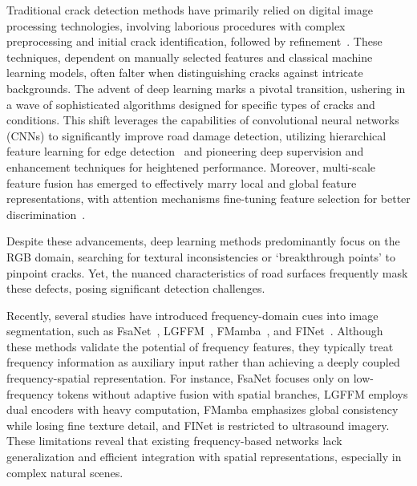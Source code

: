 \documentclass[journal]{IEEEtran}
\begin{document}
Traditional crack detection methods have primarily relied on digital image processing technologies, involving laborious procedures with complex preprocessing and initial crack identification, followed by refinement~\cite{DBLP:conf/icarcv/DinhHL16,DBLP:journals/tits/OliveiraC13}. These techniques, dependent on manually selected features and classical machine learning models, often falter when distinguishing cracks against intricate backgrounds. The advent of deep learning marks a pivotal transition, ushering in a wave of sophisticated algorithms designed for specific types of cracks and conditions. This shift leverages the capabilities of convolutional neural networks (CNNs) to significantly improve road damage detection, utilizing hierarchical feature learning for edge detection~\cite{DBLP:journals/ijon/LiuYLXL19,DBLP:journals/tits/YangZYPML20} and pioneering deep supervision and enhancement techniques for heightened performance. Moreover, multi-scale feature fusion has emerged to effectively marry local and global feature representations, with attention mechanisms fine-tuning feature selection for better discrimination~\cite{DBLP:journals/wicomm/HuHYHL21,DBLP:journals/cacie/QuqaLL23,li2018automatic}.

Despite these advancements, deep learning methods predominantly focus on the RGB domain, searching for textural inconsistencies or `breakthrough points' to pinpoint cracks. Yet, the nuanced characteristics of road surfaces frequently mask these defects, posing significant detection challenges. 





Recently, several studies have introduced frequency-domain cues into image segmentation, such as FsaNet~\cite{DBLP:journals/tip/ZhangPG23}, LGFFM~\cite{11129883TMI}, FMamba~\cite{DBLP:journals/tim/LiuLLWZS25}, and FINet~\cite{DBLP:journals/tcsv/WangZZGY25}. 
Although these methods validate the potential of frequency features, they typically treat frequency information as auxiliary input rather than achieving a deeply coupled frequency-spatial representation. 
For instance, FsaNet focuses only on low-frequency tokens without adaptive fusion with spatial branches, LGFFM employs dual encoders with heavy computation, FMamba emphasizes global consistency while losing fine texture detail, and FINet is restricted to ultrasound imagery. 
These limitations reveal that existing frequency-based networks lack generalization and efficient integration with spatial representations, especially in complex natural scenes.
\end{document}
